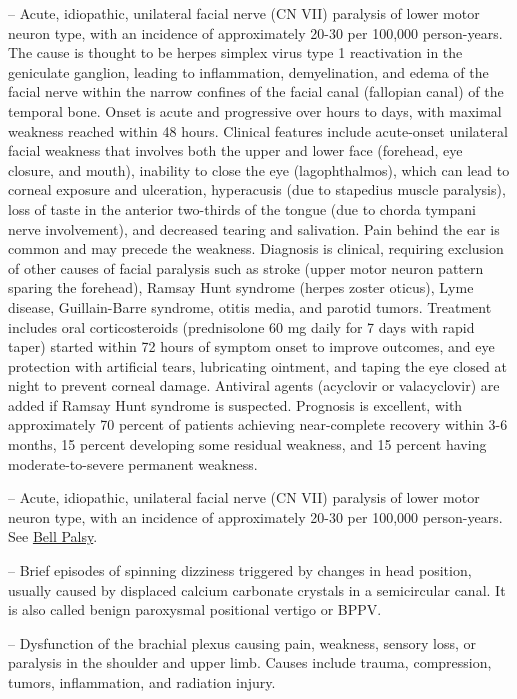 -- Acute, idiopathic, unilateral facial nerve (CN VII) paralysis of lower motor neuron type, with an incidence of approximately 20-30 per 100,000 person-years. The cause is thought to be herpes simplex virus type 1 reactivation in the geniculate ganglion, leading to inflammation, demyelination, and edema of the facial nerve within the narrow confines of the facial canal (fallopian canal) of the temporal bone. Onset is acute and progressive over hours to days, with maximal weakness reached within 48 hours. Clinical features include acute-onset unilateral facial weakness that involves both the upper and lower face (forehead, eye closure, and mouth), inability to close the eye (lagophthalmos), which can lead to corneal exposure and ulceration, hyperacusis (due to stapedius muscle paralysis), loss of taste in the anterior two-thirds of the tongue (due to chorda tympani nerve involvement), and decreased tearing and salivation. Pain behind the ear is common and may precede the weakness. Diagnosis is clinical, requiring exclusion of other causes of facial paralysis such as stroke (upper motor neuron pattern sparing the forehead), Ramsay Hunt syndrome (herpes zoster oticus), Lyme disease, Guillain-Barre syndrome, otitis media, and parotid tumors. Treatment includes oral corticosteroids (prednisolone 60 mg daily for 7 days with rapid taper) started within 72 hours of symptom onset to improve outcomes, and eye protection with artificial tears, lubricating ointment, and taping the eye closed at night to prevent corneal damage. Antiviral agents (acyclovir or valacyclovir) are added if Ramsay Hunt syndrome is suspected. Prognosis is excellent, with approximately 70 percent of patients achieving near-complete recovery within 3-6 months, 15 percent developing some residual weakness, and 15 percent having moderate-to-severe permanent weakness.

-- Acute, idiopathic, unilateral facial nerve (CN VII) paralysis of lower motor neuron type, with an incidence of approximately 20-30 per 100,000 person-years. See \hyperlink{Bell Palsy}{Bell Palsy}.

-- Brief episodes of spinning dizziness triggered by changes in head position, usually caused by displaced calcium carbonate crystals in a semicircular canal. It is also called benign paroxysmal positional vertigo or BPPV.

-- Dysfunction of the brachial plexus causing pain, weakness, sensory loss, or paralysis in the shoulder and upper limb. Causes include trauma, compression, tumors, inflammation, and radiation injury.


